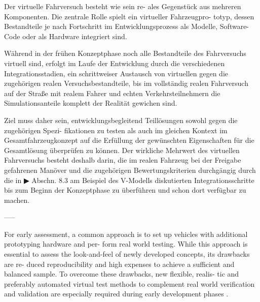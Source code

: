Der virtuelle Fahrversuch besteht wie sein re- ales Gegenstück aus mehreren Komponenten. Die zentrale Rolle spielt ein virtueller Fahrzeugpro- totyp, dessen Bestandteile je nach Fortschritt im Entwicklungsprozess als Modelle, Software-Code oder als Hardware integriert sind.

Während in der frühen Konzeptphase noch alle Bestandteile des Fahrversuchs virtuell sind, erfolgt im Laufe der Entwicklung durch die verschiedenen Integrationsstadien, ein schrittweiser Austausch von virtuellen gegen die zugehörigen realen Versuchsbestandteile, bis im vollständig realen Fahrversuch auf der Straße mit realem Fahrer und echten Verkehrsteilnehmern die Simulationsanteile komplett der Realität gewichen sind.

Ziel muss daher sein, entwicklungsbegleitend Teillösungen sowohl gegen die zugehörigen Spezi- fikationen zu testen als auch im gleichen Kontext im Gesamtfahrzeugkonzept auf die Erfüllung der gewünschten Eigenschaften für die Gesamtlösung überprüfen zu können. Der wirkliche Mehrwert des virtuellen Fahrversuchs besteht deshalb darin, die im realen Fahrzeug bei der Freigabe gefahrenen Manöver und die zugehörigen Bewertungskriterien durchgängig durch die in ▶ Abschn. 8.3 am Beispiel des V-Modells diskutierten Integrationsschritte bis zum Beginn der Konzeptphase zu überführen und schon dort verfügbar zu machen.

-----

For early assessment, a common approach is to set up vehicles with additional prototyping hardware and per- form real world testing. While this approach is essential to assess the look-and-feel of newly developed concepts, its drawbacks are re- duced reproducibility and high expenses to achieve a sufficient and balanced sample. To overcome these drawbacks, new flexible, realis- tic and preferably automated virtual test methods to complement real world verification and validation are especially required during early development phases \cite{bach2017reactive}.

